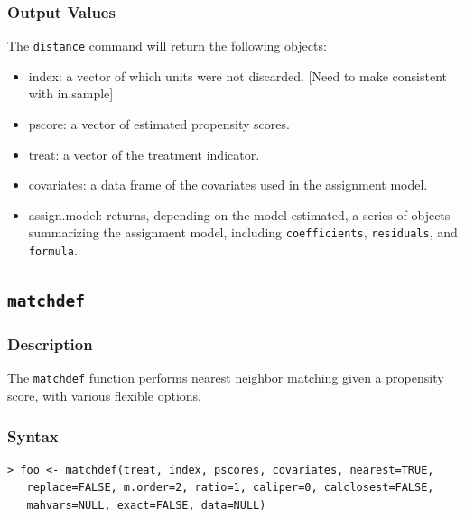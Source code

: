 \documentclass[oneside,letterpaper,titlepage]{article}
\begin{document}
\begin{appendix}
\subsubsection{Output Values}
The \texttt{distance} command will return the following objects:
\begin{itemize}
\item{index}: a vector of which units were not discarded. [Need to
  make consistent with in.sample]
\item{pscore}: a vector of estimated propensity scores. 
\item{treat}: a vector of the treatment indicator.
\item{covariates}: a data frame of the covariates used in the
  assignment model.
\item{assign.model}: returns, depending on the model estimated, a 
  series of objects summarizing the assignment model, including
  \texttt{coefficients}, \texttt{residuals},
  and \texttt{formula}. 
\end{itemize}

\subsection{\texttt{matchdef}}
\subsubsection{Description}
The \texttt{matchdef} function performs nearest neighbor matching
given a propensity score, with various flexible options. 

\subsubsection{Syntax}
\begin{verbatim}
> foo <- matchdef(treat, index, pscores, covariates, nearest=TRUE,
   replace=FALSE, m.order=2, ratio=1, caliper=0, calclosest=FALSE,
   mahvars=NULL, exact=FALSE, data=NULL)
\end{verbatim}


\end{appendix}
\end{document}
